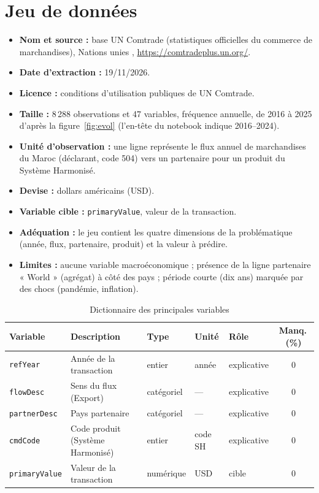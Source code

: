 \documentclass[11pt,a4paper]{article}
\begin{document}
\section{Jeu de données}\label{sec:data}
\begin{itemize}[leftmargin=1.2em]
\item \textbf{Nom et source :} base UN Comtrade (statistiques officielles du commerce de marchandises), Nations unies \cite{comtrade}, \url{https://comtradeplus.un.org/}.
\item \textbf{Date d'extraction :} 19/11/2026.
\item \textbf{Licence :} conditions d'utilisation publiques de UN Comtrade.
\item \textbf{Taille :} 8\,288 observations et 47 variables, fréquence annuelle, de 2016 à 2025 d'après la figure~\ref{fig:evol} (l'en-tête du notebook indique 2016--2024).
\item \textbf{Unité d'observation :} une ligne représente le flux annuel de marchandises du Maroc (déclarant, code 504) vers un partenaire pour un produit du Système Harmonisé.
\item \textbf{Devise :} dollars américains (USD).
\item \textbf{Variable cible :} \texttt{primaryValue}, valeur de la transaction.
\item \textbf{Adéquation :} le jeu contient les quatre dimensions de la problématique (année, flux, partenaire, produit) et la valeur à prédire.
\item \textbf{Limites :} aucune variable macroéconomique ; présence de la ligne partenaire « World » (agrégat) à côté des pays ; période courte (dix ans) marquée par des chocs (pandémie, inflation).
\end{itemize}

\begin{table}[H]\centering\small
\caption{Dictionnaire des principales variables}
\begin{tabularx}{\textwidth}{@{}lXlllc@{}}
\toprule
Variable & Description & Type & Unité & Rôle & Manq.\,(\%)\\\midrule
\texttt{refYear} & Année de la transaction & entier & année & explicative & 0\\
\texttt{flowDesc} & Sens du flux (Export) & catégoriel & --- & explicative & 0\\
\texttt{partnerDesc} & Pays partenaire & catégoriel & --- & explicative & 0\\
\texttt{cmdCode} & Code produit (Système Harmonisé) & entier & code SH & explicative & 0\\
\texttt{primaryValue} & Valeur de la transaction & numérique & USD & cible & 0\\
\bottomrule
\end{tabularx}
\end{table}
\end{document}
